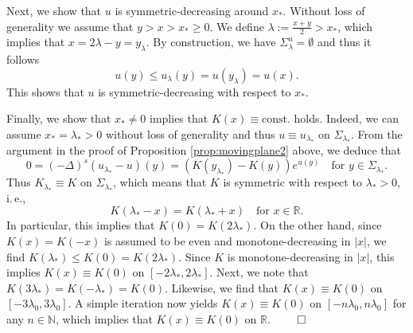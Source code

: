 \documentclass[reqno,10pt,a4paper]{amsart}
\theoremstyle{definition}
\theoremstyle{definition}
\theoremstyle{remark}
\theoremstyle{remark}
\numberwithin{equation}{section}
\newcommand{\N}{\mathbb{N}}
\newcommand{\R}{\mathbb{R}}
\newcommand{\Ds}{(-\Delta)^{s}}
\begin{document}
\begin{appendix}
    Next, we show that $u$ is symmetric-decreasing around $x_*$. Without loss of generality we assume that $y>x>x_*\geq 0$. We define $\lambda := \frac{x+y}{2}>x_*$, which implies that $x = 2\lambda - y = y_\lambda$. By construction, we have $\Sigma^u_\lambda = \emptyset$ and thus it follows
    \begin{equation*}
        u(y) \leq u_\lambda(y) = u(y_\lambda) = u(x).
    \end{equation*}
    This shows that $u$ is symmetric-decreasing with respect to $x_*$.
    
    Finally, we show that $x_* \neq 0$ implies that $K(x) \equiv \mbox{const}.$ holds. Indeed, we can assume $x_* = \lambda_* > 0$ without loss of generality and thus $u \equiv u_{\lambda_*}$ on $\Sigma_{\lambda_*}$. From the argument in the proof of Proposition \ref{prop:movingplane2} above, we deduce that
    $$
    0=\Ds( u_{\lambda_*} - u)(y) = (K(y_{\lambda_*}) - K(y)) e^{u(y)} \quad \mbox{for $y \in \Sigma_{\lambda_*}$}.
    $$
    Thus $K_{\lambda_*} \equiv K$ on $\Sigma_{\lambda_*}$, which means that $K$ is symmetric with respect to $\lambda_* > 0$, i.\,e.,
    $$
    K(\lambda_* - x) = K(\lambda_* + x) \quad \mbox{for $x \in \R$}.
    $$
    In particular, this implies that $K(0) = K(2 \lambda_*)$. On the other hand, since $K(x) = K(-x)$ is assumed to be even and monotone-decreasing in $|x|$, we find $K(\lambda_*) \leq K(0) = K(2 \lambda_*)$. Since $K$ is monotone-decreasing in $|x|$, this implies $K(x) \equiv K(0)$ on $[-2 \lambda_*, 2 \lambda_*]$. Next, we note that $K(3 \lambda_*) = K(-\lambda_*) = K(0)$. Likewise, we find that $K(x) \equiv K(0)$ on $[-3 \lambda_0, 3 \lambda_0]$. A simple iteration now yields $K(x) \equiv K(0)$ on $[-n \lambda_0, n \lambda_0]$ for any $n \in \N$, which implies that $K(x) \equiv K(0)$ on $\R$. \hfill $\qed$
    
\end{appendix}



\end{document}
